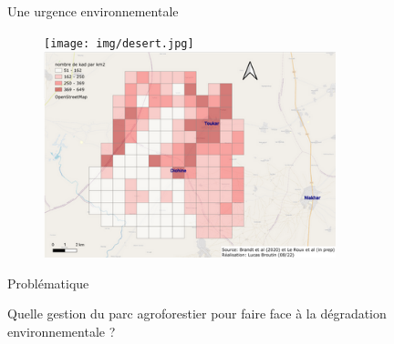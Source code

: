 \documentclass[aspectratio=169]{beamer}
\begin{document}
\begin{frame}{Une urgence environnementale}
    \begin{center}
        \vspace{-1em}
        \begin{figure}
            \centering
            \texttt{[image: img/desert.jpg]}~
            \includegraphics[height = 6cm]{img/densiteArbres.png}
        \end{figure}
    \end{center}
\end{frame}

\begin{frame}{Problématique}
    \begin{center}
        \large{Quelle gestion du parc agroforestier pour faire face à la dégradation environnementale ?}
    \end{center}
\end{frame}
\end{document}
